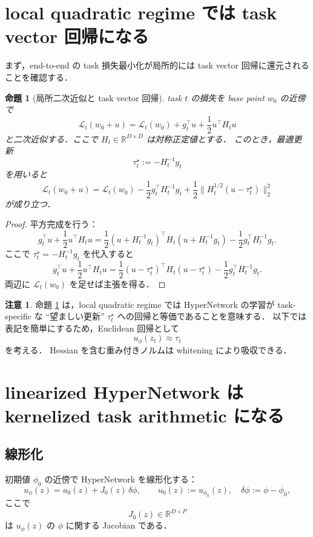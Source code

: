 \documentclass[a4paper,11pt]{bxjsarticle}
\newtheorem{proposition}[theorem]{命題}
\theoremstyle{definition}
\newtheorem{remark}[theorem]{注意}
\begin{document}
\section{local quadratic regime では task vector 回帰になる}

まず，end-to-end の task 損失最小化が局所的には task vector 回帰に還元されることを確認する．

\begin{proposition}[局所二次近似と task vector 回帰]
\label{prop:local-quadratic}
task $t$ の損失を base point $w_0$ の近傍で
\[
\mathcal{L}_t(w_0+u)
=
\mathcal{L}_t(w_0)+g_t^\top u+\frac12 u^\top H_t u
\]
と二次近似する．ここで $H_t \in \mathbb{R}^{D\times D}$ は対称正定値とする．
このとき，最適更新
\[
\tau_t^\star := -H_t^{-1}g_t
\]
を用いると
\[
\mathcal{L}_t(w_0+u)
=
\mathcal{L}_t(w_0)-\frac12 g_t^\top H_t^{-1}g_t
+\frac12 \|H_t^{1/2}(u-\tau_t^\star)\|_2^2
\]
が成り立つ．
\end{proposition}

\begin{proof}
平方完成を行う：
\[
g_t^\top u+\frac12 u^\top H_t u
=
\frac12\left(u+H_t^{-1}g_t\right)^\top H_t\left(u+H_t^{-1}g_t\right)
-\frac12 g_t^\top H_t^{-1}g_t.
\]
ここで $\tau_t^\star=-H_t^{-1}g_t$ を代入すると
\[
g_t^\top u+\frac12 u^\top H_t u
=
\frac12 (u-\tau_t^\star)^\top H_t (u-\tau_t^\star)
-\frac12 g_t^\top H_t^{-1}g_t.
\]
両辺に $\mathcal{L}_t(w_0)$ を足せば主張を得る．
\end{proof}

\begin{remark}
命題 \ref{prop:local-quadratic} は，local quadratic regime では
HyperNetwork の学習が task-specific な ``望ましい更新'' $\tau_t^\star$ への回帰と等価であることを意味する．
以下では表記を簡単にするため，Euclidean 回帰として
\[
u_\phi(z_t)\approx \tau_t
\]
を考える．
Hessian を含む重み付きノルムは whitening により吸収できる．
\end{remark}

\section{linearized HyperNetwork は kernelized task arithmetic になる}

\subsection{線形化}

初期値 $\phi_0$ の近傍で HyperNetwork を線形化する：
\[
u_\phi(z)
=
u_0(z)+J_0(z)\,\delta\phi,
\qquad
u_0(z):=u_{\phi_0}(z),\quad
\delta\phi:=\phi-\phi_0,
\]
ここで
\[
J_0(z)\in \mathbb{R}^{D\times P}
\]
は $u_\phi(z)$ の $\phi$ に関する Jacobian である．
\end{document}
